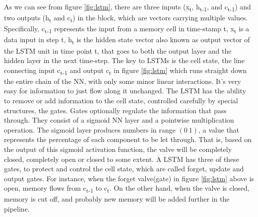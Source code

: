     As we can see from figure \ref{fig:lstm}, there are three inputs (x\textsubscript{t}, h\textsubscript{t-1}, and c\textsubscript{t-1}) and two outputs (h\textsubscript{t} and c\textsubscript{t}) in the block, which are vectors carrying multiple values. Specifically, c\textsubscript{t-1} represents the input from a memory cell in time-stamp t, x\textsubscript{t} is a data input in step t, h\textsubscript{t} is the hidden state vector also known as output vector of the LSTM unit in time point t, that goes to both the output layer and the hidden layer in the next time-step. The key to LSTMs is the cell state, the line connecting input c\textsubscript{t-1} and output c\textsubscript{t} in figure \ref{fig:lstm} which runs straight down the entire chain of the NN, with only some minor linear interactions. It’s very easy for information to just flow along it unchanged. The LSTM has the ability to remove or add information to the cell state, controlled carefully by special structures, the gates. Gates optionally regulate the information that pass through. They consist of a sigmoid NN layer and a pointwise multiplication operation. The sigmoid layer produces numbers in range $( 0 \ 1 )$, a value that represents the percentage of each component to be let through. That is, based on the output of this sigmoid activation function, the valve will be completely closed, completely open or closed to some extent. A LSTM has three of these gates, to protect and control the cell state, which are called forget, update and output gates. For instance, when the forget valve(gate) in figure \ref{fig:lstm} above is open, memory flows from c\textsubscript{t-1} to c\textsubscript{t}. On the other hand, when the valve is closed, memory is cut off, and probably new memory will be added further in the pipeline.

